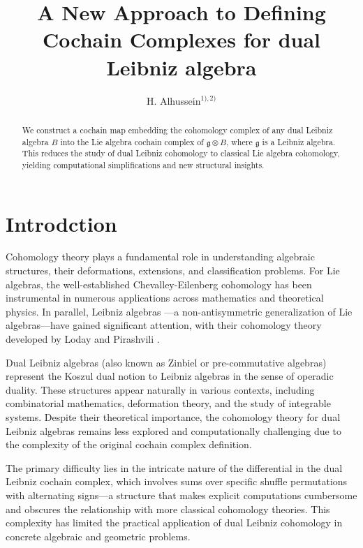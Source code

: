 \documentclass[a4paper, 12pt,oneside,reqno]{amsart}
\title{A New Approach to Defining Cochain Complexes for dual Leibniz algebra}
\author{H. Alhussein$^{1),2)}$}
\begin{document}
\begin{abstract}
  We construct a cochain map embedding the cohomology complex of any dual Leibniz algebra $B$ into the Lie algebra cochain complex of $\mathfrak{g} \otimes B$, where $\mathfrak{g}$ is a Leibniz algebra. This reduces the study of dual Leibniz cohomology to classical Lie algebra cohomology, yielding computational simplifications and new structural insights.
\end{abstract}
\maketitle

\tableofcontents

\section{Introdction}


Cohomology theory plays a fundamental role in understanding algebraic structures, their deformations, extensions, and classification problems. For Lie algebras, the well-established Chevalley-Eilenberg cohomology \cite{chevalley-eilenberg} has been instrumental in numerous applications across mathematics and theoretical physics. In parallel, Leibniz algebras \cite{Loday}—a non-antisymmetric generalization of Lie algebras—have gained significant attention, with their cohomology theory developed by Loday and Pirashvili \cite{LodayPirashvili}.

Dual Leibniz algebras (also known as Zinbiel or pre-commutative algebras) \cite{Chapoton2001,Loday} represent the Koszul dual notion to Leibniz algebras in the sense of operadic duality. These structures appear naturally in various contexts, including combinatorial mathematics, deformation theory, and the study of integrable systems. Despite their theoretical importance, the cohomology theory for dual Leibniz algebras remains less explored and computationally challenging due to the complexity of the original cochain complex definition.

The primary difficulty lies in the intricate nature of the differential in the dual Leibniz cochain complex, which involves sums over specific shuffle permutations with alternating signs—a structure that makes explicit computations cumbersome and obscures the relationship with more classical cohomology theories. This complexity has limited the practical application of dual Leibniz cohomology in concrete algebraic and geometric problems.
\end{document}

